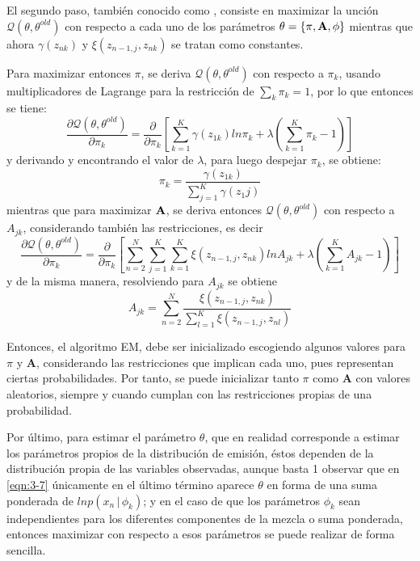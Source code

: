 El segundo paso, también conocido como \mstep, consiste en maximizar la unción $\mathcal{Q}(\theta, \theta^{old})$ con respecto a cada uno de los parámetros $\theta = \lbrace \pi, \textbf{A}, \phi \rbrace$ mientras que ahora $\gamma(z_{nk})$ y $\xi(z_{n-1,j}, z_{nk})$ se tratan como constantes.

Para maximizar entonces $\pi$, se deriva $\mathcal{Q}(\theta, \theta^{old})$ con respecto a $\pi_k$, usando multiplicadores de Lagrange para la restricción de $\sum_k \pi_k = 1$, por lo que entonces se tiene: 
\begin{equation*}
  \frac {\partial \mathcal{Q}(\theta, \theta^{old})}{\partial \pi_k} = 
  \frac {\partial}{\partial \pi_k} 
  \left[
    \sum_{k=1}^K \gamma(z_{1k}) ln \pi_k + \lambda (\sum_{k=1}^K \pi_k - 1) 
  \right]
\end{equation*}
y derivando y encontrando el valor de $\lambda$, para luego despejar $\pi_k$, se obtiene:
\begin{equation}
  \pi_k = \frac{\gamma(z_{1k})}{\sum_{j=1}^K \gamma(z_1j)}
\label{eqn:3-8}
\end{equation}
mientras que para maximizar $\textbf{A}$, se deriva entonces $\mathcal{Q}(\theta, \theta^{old})$ con respecto a $A_{jk}$, considerando también las restricciones, es decir
\begin{equation*}
  \frac {\partial \mathcal{Q}(\theta, \theta^{old})}{\partial \pi_k} = 
  \frac {\partial}{\partial \pi_k} 
  \left[
    \sum_{n=2}^N \sum_{j=1}^K \sum_{k=1}^K \xi(z_{n-1,j}, z_{nk}) ln A_{jk} 
    + \lambda (\sum_{k=1}^K A_{jk} - 1) 
  \right]
\end{equation*}
y de la misma manera, resolviendo para $A_{jk}$ se obtiene
\begin{equation}
A_{jk} = \sum_{n=2}^N 
  \frac{\xi(z_{n-1,j}, z_{nk})}
  {\sum_{l=1}^K \xi(z_{n-1,j}, z_{nl})}
\label{eqn:3-9}
\end{equation}

Entonces, el algoritmo EM, debe ser inicializado escogiendo algunos valores para $\pi$ y $\mathbf{A}$, considerando las restricciones que implican cada uno, pues representan ciertas probabilidades. Por tanto, se puede inicializar tanto $\pi$ como $\mathbf{A}$ con valores aleatorios, siempre y cuando cumplan con las restricciones propias de una probabilidad. 

Por último, para estimar el parámetro $\theta$, que en realidad corresponde a estimar los parámetros propios de la distribución de emisión, éstos dependen de la distribución propia de las variables observadas, aunque basta 1 observar que en \eqref{eqn:3-7} únicamente en el último término aparece $\theta$ en forma de una suma ponderada de $ln p(x_n \,|\,  \phi_k)$; y en el caso de que los parámetros $\phi_k$ sean independientes para los diferentes componentes de la mezcla o suma ponderada, entonces maximizar con respecto a esos parámetros se puede realizar de forma sencilla.


